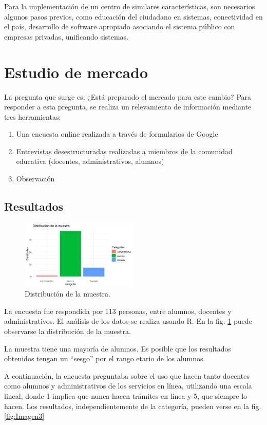 \documentclass[a4paper]{article}
\begin{document}
Para la implementación de un centro de similares características, son necesarios algunos pasos previos, como educación del ciudadano en sistemas, conectividad en el país, desarrollo de software apropiado asociando el sistema público con empresas privadas, unificando sistemas. 

\section{Estudio de mercado}

La pregunta que surge es: ¿Está preparado el mercado para este cambio? Para responder a esta pregunta, se realiza un relevamiento de información mediante tres herramientas: 

\begin{enumerate}
\item Una encuesta online realizada a través de formularios de Google
\item Entrevistas desestructuradas realizadas a miembros de la comunidad educativa (docentes, administrativos, alumnos)
\item Observación
\end{enumerate}

\subsection{Resultados}

\begin{figure}
\centering
\includegraphics[width=0.5\textwidth]{Imagen2.png}
\caption{\label{fig:Imagen2}Distribución de la muestra.}
\end{figure}

La encuesta fue respondida por 113 personas, entre alumnos, docentes y administrativos. El análisis de los datos se realiza usando R. En la fig. \ref{fig:Imagen2} puede observarse la distribución de la muestra.

La muestra tiene una mayoría de alumnos. Es posible que los resultados obtenidos tengan un “sesgo” por el rango etario de los alumnos.

A continuación, la encuesta preguntaba sobre el uso que hacen tanto docentes como alumnos y administrativos de los servicios en línea, utilizando una escala lineal, donde 1 implica que nunca hacen trámites en línea y 5, que siempre lo hacen. Los resultados, independientemente de la categoría, pueden verse en la fig. \ref{fig:Imagen3}
\end{document}
